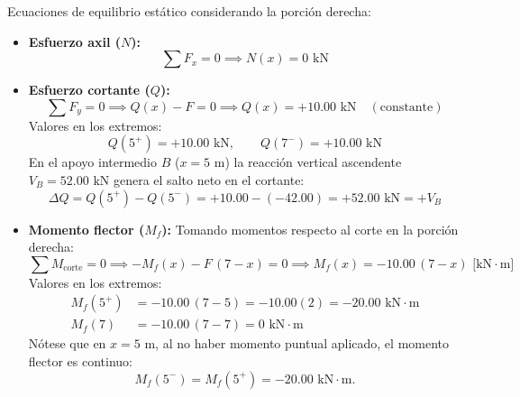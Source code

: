 Ecuaciones de equilibrio estático considerando la porción derecha:
\begin{itemize}
    \item \textbf{Esfuerzo axil ($N$):}
          \begin{equation}
              \sum F_x = 0 \implies \boxed{N(x) = 0\text{ kN}}
          \end{equation}

    \item \textbf{Esfuerzo cortante ($Q$):}
          \begin{equation}
              \sum F_y = 0 \implies Q(x) - F = 0 \implies \boxed{Q(x) = +10.00\text{ kN}} \quad (\text{constante})
          \end{equation}
          Valores en los extremos:
          \begin{equation*}
              Q(5^+) = +10.00\text{ kN}, \qquad Q(7^-) = +10.00\text{ kN}
          \end{equation*}
          En el apoyo intermedio $B$ ($x = 5\text{ m}$) la reacción vertical ascendente $V_B = 52.00\text{ kN}$ genera el salto neto en el cortante:
          \begin{equation}
              \Delta Q = Q(5^+) - Q(5^-) = +10.00 - (-42.00) = +52.00\text{ kN} = +V_B
          \end{equation}

    \item \textbf{Momento flector ($M_f$):}
          Tomando momentos respecto al corte en la porción derecha:
          \begin{equation}
              \sum M_{\text{corte}} = 0 \implies -M_f(x) - F\,(7 - x) = 0 \implies \boxed{M_f(x) = -10.00\,(7 - x)\text{ [kN}\cdot\text{m]}}
          \end{equation}
          Valores en los extremos:
          \begin{align*}
              M_f(5^+) & = -10.00\,(7 - 5) = -10.00(2) = \boxed{-20.00\text{ kN}\cdot\text{m}} \\
              M_f(7)   & = -10.00\,(7 - 7) = \boxed{0\text{ kN}\cdot\text{m}}
          \end{align*}
          Nótese que en $x = 5\text{ m}$, al no haber momento puntual aplicado, el momento flector es continuo:
          \[
              M_f(5^-) = M_f(5^+) = -20.00\text{ kN}\cdot\text{m}.
          \]
\end{itemize}


